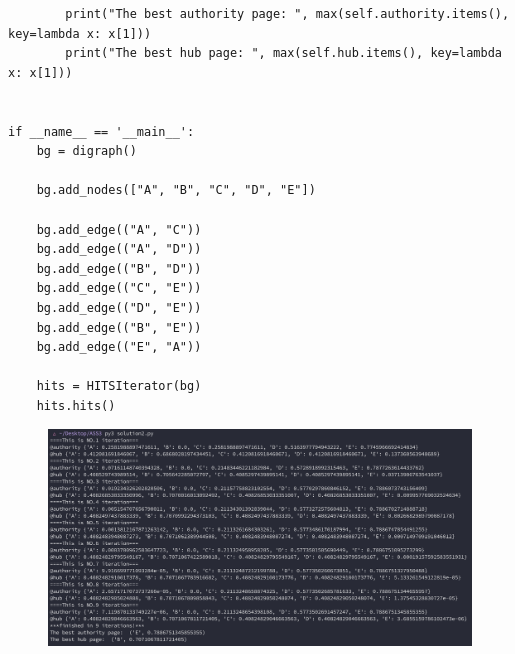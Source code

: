 \documentclass{article}
\begin{document}
\begin{lstlisting}
        print("The best authority page: ", max(self.authority.items(), key=lambda x: x[1]))
        print("The best hub page: ", max(self.hub.items(), key=lambda x: x[1]))


if __name__ == '__main__':
    bg = digraph()

    bg.add_nodes(["A", "B", "C", "D", "E"])

    bg.add_edge(("A", "C"))
    bg.add_edge(("A", "D"))
    bg.add_edge(("B", "D"))
    bg.add_edge(("C", "E"))
    bg.add_edge(("D", "E"))
    bg.add_edge(("B", "E"))
    bg.add_edge(("E", "A"))

    hits = HITSIterator(bg)
    hits.hits()
\end{lstlisting}

\begin{figure}[H]
    \includegraphics[width=1\textwidth]{Fig4}
\end{figure}
\end{document}
